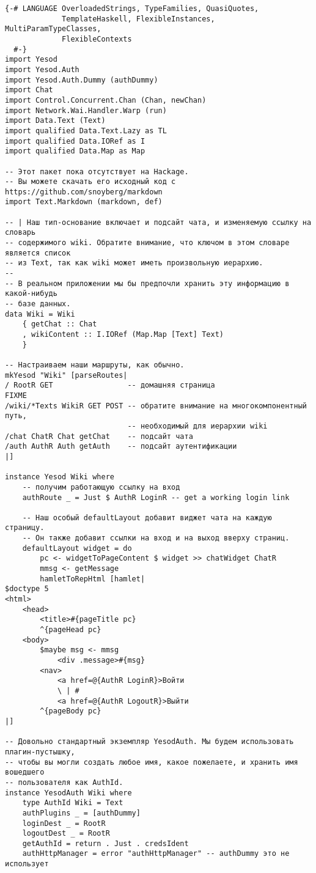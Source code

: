 \begin{lstlisting}
{-# LANGUAGE OverloadedStrings, TypeFamilies, QuasiQuotes,
             TemplateHaskell, FlexibleInstances, MultiParamTypeClasses,
             FlexibleContexts
  #-}
import Yesod
import Yesod.Auth
import Yesod.Auth.Dummy (authDummy)
import Chat
import Control.Concurrent.Chan (Chan, newChan)
import Network.Wai.Handler.Warp (run)
import Data.Text (Text)
import qualified Data.Text.Lazy as TL
import qualified Data.IORef as I
import qualified Data.Map as Map

-- Этот пакет пока отсутствует на Hackage.
-- Вы можете скачать его исходный код с https://github.com/snoyberg/markdown
import Text.Markdown (markdown, def)

-- | Наш тип-основание включает и подсайт чата, и изменяемую ссылку на словарь
-- содержимого wiki. Обратите внимание, что ключом в этом словаре является список
-- из Text, так как wiki может иметь произвольную иерархию.
--
-- В реальном приложении мы бы предпочли хранить эту информацию в какой-нибудь
-- базе данных.
data Wiki = Wiki
    { getChat :: Chat
    , wikiContent :: I.IORef (Map.Map [Text] Text)
    }

-- Настраиваем наши маршруты, как обычно.
mkYesod "Wiki" [parseRoutes|
/ RootR GET                 -- домашняя страница
FIXME
/wiki/*Texts WikiR GET POST -- обратите внимание на многокомпонентный путь,
                            -- необходимый для иерархии wiki
/chat ChatR Chat getChat    -- подсайт чата
/auth AuthR Auth getAuth    -- подсайт аутентификации
|]

instance Yesod Wiki where
    -- получим работающую ссылку на вход
    authRoute _ = Just $ AuthR LoginR -- get a working login link

    -- Наш особый defaultLayout добавит виджет чата на каждую страницу.
    -- Он также добавит ссылки на вход и на выход вверху страниц.
    defaultLayout widget = do
        pc <- widgetToPageContent $ widget >> chatWidget ChatR
        mmsg <- getMessage
        hamletToRepHtml [hamlet|
$doctype 5
<html>
    <head>
        <title>#{pageTitle pc}
        ^{pageHead pc}
    <body>
        $maybe msg <- mmsg
            <div .message>#{msg}
        <nav>
            <a href=@{AuthR LoginR}>Войти
            \ | #
            <a href=@{AuthR LogoutR}>Выйти
        ^{pageBody pc}
|]

-- Довольно стандартный экземпляр YesodAuth. Мы будем использовать плагин-пустышку,
-- чтобы вы могли создать любое имя, какое пожелаете, и хранить имя вошедшего
-- пользователя как AuthId.
instance YesodAuth Wiki where
    type AuthId Wiki = Text
    authPlugins _ = [authDummy]
    loginDest _ = RootR
    logoutDest _ = RootR
    getAuthId = return . Just . credsIdent
    authHttpManager = error "authHttpManager" -- authDummy это не использует


\end{lstlisting}
